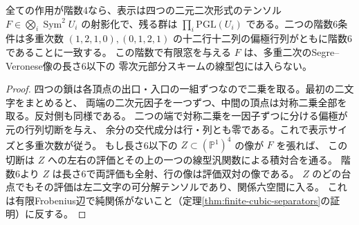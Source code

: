 \begin{corollary}\label{cor:two-dimensional-full-arrow-apolarity}
全ての作用が階数4なら、表示は四つの二元二次形式のテンソル
$F\in\bigotimes_i\operatorname{Sym}^2 U_i$ の射影化で、残る群は
$\prod_i\mathrm{PGL}(U_i)$ である。二つの階数6条件は多重次数
$(1,2,1,0),(0,1,2,1)$ の十二行十二列の偏極行列がともに階数6であることに一致する。
この階数で有限窓を与える $F$ は、多重二次のSegre--Veronese像の長さ6以下の
零次元部分スキームの線型包には入らない。
\end{corollary}
\begin{proof}
四つの鎖は各頂点の出口・入口の一組ずつなので二乗を取る。最初の二文字をまとめると、
両端の二次元因子を一つずつ、中間の頂点は対称二乗全部を取る。反対側も同様である。
二つの端で対称二乗を一因子ずつに分ける偏極が元の行列切断を与え、
余分の交代成分は行・列とも零である。これで表示サイズと多重次数が従う。
もし長さ6以下の $Z\subset(\mathbb P^1)^4$ の像が $F$ を張れば、
この切断は $Z$ への左右の評価とその上の一つの線型汎関数による積対合を通る。
階数6より $Z$ は長さ6で両評価も全射、行の像は評価双対の像である。
$Z$ のどの台点でもその評価は左二文字の可分解テンソルであり、関係六空間に入る。
これは有限Frobenius辺で純関係がないこと（定理\ref{thm:finite-cubic-separators}の証明）に反する。
\end{proof}
